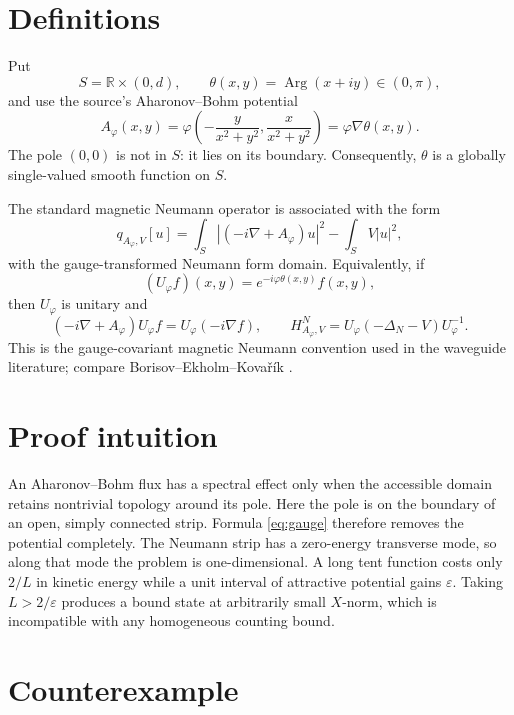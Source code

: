 \documentclass[11pt]{article}
\newcommand{\R}{\mathbb{R}}
\begin{document}
\clearpage
\section{Definitions}

Put
\[
 S=\R\times(0,d),\qquad
 \theta(x,y)=\operatorname{Arg}(x+iy)\in(0,\pi),
\]
and use the source's Aharonov--Bohm potential
\begin{equation}\label{eq:A}
 A_\varphi(x,y)=\varphi\left(
 -\frac{y}{x^2+y^2},\frac{x}{x^2+y^2}\right)
 =\varphi\nabla\theta(x,y).
\end{equation}
The pole $(0,0)$ is not in $S$: it lies on its boundary.  Consequently,
$\theta$ is a globally single-valued smooth function on $S$.

The standard magnetic Neumann operator is associated with the form
\begin{equation}\label{eq:form}
 q_{A_\varphi,V}[u]
 =\int_S|(-i\nabla+A_\varphi)u|^2
  -\int_SV|u|^2,
\end{equation}
with the gauge-transformed Neumann form domain.  Equivalently, if
\[
 (U_\varphi f)(x,y)=e^{-i\varphi\theta(x,y)}f(x,y),
\]
then $U_\varphi$ is unitary and
\begin{equation}\label{eq:gauge}
 (-i\nabla+A_\varphi)U_\varphi f
 =U_\varphi(-i\nabla f),
 \qquad
 H^N_{A_\varphi,V}=U_\varphi(-\Delta_N-V)U_\varphi^{-1}.
\end{equation}
This is the gauge-covariant magnetic Neumann convention used in the waveguide
literature; compare Borisov--Ekholm--Kovařík \cite{BEK}.

\section{Proof intuition}

An Aharonov--Bohm flux has a spectral effect only when the accessible domain
retains nontrivial topology around its pole.  Here the pole is on the boundary
of an open, simply connected strip.  Formula \eqref{eq:gauge} therefore
removes the potential completely.  The Neumann strip has a zero-energy
transverse mode, so along that mode the problem is one-dimensional.  A long
tent function costs only $2/L$ in kinetic energy while a unit interval of
attractive potential gains $\varepsilon$.  Taking $L>2/\varepsilon$ produces
a bound state at arbitrarily small $X$-norm, which is incompatible with any
homogeneous counting bound.

\section{Counterexample}
\end{document}
